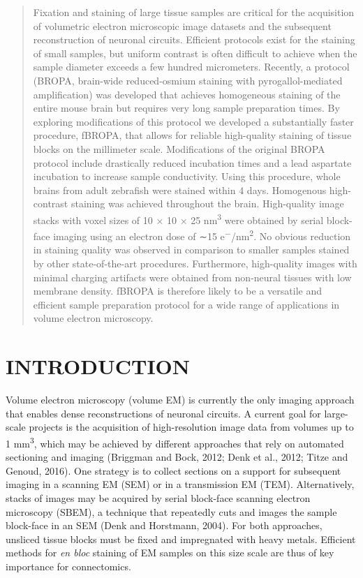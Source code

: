 \documentclass{article}
\begin{document}
\begin{quote}
Fixation and staining of large tissue samples are critical for the acquisition of volumetric electron microscopic image datasets and the subsequent reconstruction of neuronal circuits. Efficient protocols exist for the staining of small samples, but uniform contrast is often difficult to achieve when the sample diameter exceeds a few hundred micrometers. Recently, a protocol (BROPA, brain-wide reduced-osmium staining with pyrogallol-mediated amplification) was developed that achieves homogeneous staining of the entire mouse brain but requires very long sample preparation times. By exploring modifications of this protocol we developed a substantially faster procedure, fBROPA, that allows for reliable high-quality staining of tissue blocks on the millimeter scale. Modifications of the original BROPA protocol include drastically reduced incubation times and a lead aspartate incubation to increase sample conductivity. Using this procedure, whole brains from adult zebrafish were stained within 4 days. Homogenous high-contrast staining was achieved throughout the brain. High-quality image stacks with voxel sizes of 10 × 10 × 25 nm\textsuperscript{3} were obtained by serial block-face imaging using an electron dose of ∼15 e\textsuperscript{−}/nm\textsuperscript{2}. No obvious reduction in staining quality was observed in comparison to smaller samples stained by other state-of-the-art procedures. Furthermore, high-quality images with minimal charging artifacts were obtained from non-neural tissues with low membrane density. fBROPA is therefore likely to be a versatile and efficient sample preparation protocol for a wide range of applications in volume electron microscopy.
\end{quote}


\section*{INTRODUCTION}

Volume electron microscopy (volume EM) is currently the only imaging approach that enables dense reconstructions of neuronal circuits. A current goal for large-scale projects is the acquisition of high-resolution image data from volumes up to 1 mm\textsuperscript{3}, which may be achieved by different approaches that rely on automated sectioning and imaging (Briggman and Bock, 2012; Denk et al., 2012; Titze and Genoud, 2016). One strategy is to collect sections on a support for subsequent imaging in a scanning EM (SEM) or in a transmission EM (TEM). Alternatively, stacks of images may be acquired by serial block-face scanning electron microscopy (SBEM), a technique that repeatedly cuts and images the sample block-face in an SEM (Denk and Horstmann, 2004). For both approaches, unsliced tissue blocks must be fixed and impregnated with heavy metals. Efficient methods for \emph{en bloc} staining of EM samples on this size scale are thus of key importance for connectomics.
\end{document}
